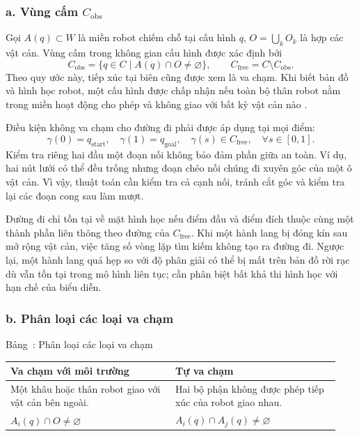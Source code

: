 \documentclass[12pt,a4paper,oneside]{report}
\renewcommand{\tablename}{Bảng}
\begin{document}
\subsubsection*{a. Vùng cấm \(C_{\mathrm{obs}}\)}

Gọi \(A(q)\subset W\) là miền robot chiếm chỗ tại cấu hình \(q\), \(O=\bigcup_k O_k\) là hợp các vật cản. Vùng cấm trong không gian cấu hình được xác định bởi
\[
  C_{\mathrm{obs}}=\{q\in C\mid A(q)\cap O\neq\varnothing\},
  \qquad C_{\mathrm{free}}=C\setminus C_{\mathrm{obs}}.
\]
Theo quy ước này, tiếp xúc tại biên cũng được xem là va chạm. Khi biết bản đồ và hình học robot, một cấu hình được chấp nhận nếu toàn bộ thân robot nằm trong miền hoạt động cho phép và không giao với bất kỳ vật cản nào \cite{lavalle-planning-2006}.

Điều kiện không va chạm cho đường đi phải được áp dụng tại mọi điểm:
\[
  \gamma(0)=q_{\mathrm{start}},\quad
  \gamma(1)=q_{\mathrm{goal}},\quad
  \gamma(s)\in C_{\mathrm{free}},\quad \forall s\in[0,1].
\]
Kiểm tra riêng hai đầu một đoạn nối không bảo đảm phần giữa an toàn. Ví dụ, hai nút lưới có thể đều trống nhưng đoạn chéo nối chúng đi xuyên góc của một ô vật cản. Vì vậy, thuật toán cần kiểm tra cả cạnh nối, tránh cắt góc và kiểm tra lại các đoạn cong sau làm mượt.

Đường đi chỉ tồn tại về mặt hình học nếu điểm đầu và điểm đích thuộc cùng một thành phần liên thông theo đường của \(C_{\mathrm{free}}\). Khi một hành lang bị đóng kín sau mở rộng vật cản, việc tăng số vòng lặp tìm kiếm không tạo ra đường đi. Ngược lại, một hành lang quá hẹp so với độ phân giải có thể bị mất trên bản đồ rời rạc dù vẫn tồn tại trong mô hình liên tục; cần phân biệt bất khả thi hình học với hạn chế của biểu diễn.

\subsubsection*{b. Phân loại các loại va chạm}

\begin{center}
\begin{minipage}{\linewidth}
  \centering
  \label{tab:collision-types}%
  \tablename~\thetable: Phân loại các loại va chạm\par\smallskip
  \renewcommand{\arraystretch}{1.3}
  \begin{tabular}{@{}p{0.47\linewidth}p{0.47\linewidth}@{}}
    \toprule
    \textbf{Va chạm với môi trường} & \textbf{Tự va chạm} \\
    \midrule
    Một khâu hoặc thân robot giao với vật cản bên ngoài. & Hai bộ phận không được phép tiếp xúc của robot giao nhau. \\[4pt]
    \(A_i(q)\cap O\neq\varnothing\) & \(A_i(q)\cap A_j(q)\neq\varnothing\) \\
    \bottomrule
  \end{tabular}
\end{minipage}
\end{center}
\end{document}
